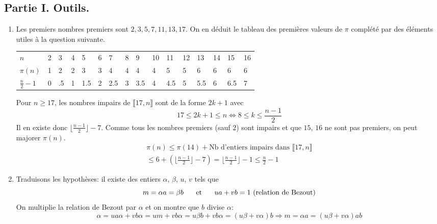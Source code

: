 \subsection*{Partie I. Outils.}
\begin{enumerate}
  \item Les premiers nombres premiers sont $2, 3, 5, 7, 11, 13, 17$. On en déduit le tableau des premières valeurs de $\pi$ complété par des éléments utiles à la question suivante.
  \begin{center}
\begin{tabular}{llllllllllllllll}
$n$             & 2 & 3 & 4 & 5 & 6 & 7 & 8 & 9 & 10 & 11 & 12 & 13 & 14 & 15 &16 \\
$\pi(n)$        & 1 & 2 & 2 & 3 & 3 & 4 & 4 & 4 & 4  & 5  & 5  & 6  & 6  & 6  & 6  \\
$\frac{n}{2}-1$ & 0 & .5& 1 &1.5& 2 &2.5& 3 &3.5& 4  & 4.5& 5  & 5.5& 6  & 6.5& 7  
  \end{tabular}
  \end{center}
Pour $n\geq 17$, les nombres impairs de $\llbracket 17, n\rrbracket$ sont de la forme $2k+1$ avec
\begin{displaymath}
  17 \leq 2k+1 \leq n \Leftrightarrow 8 \leq k \leq \frac{n-1}{2}
\end{displaymath}
Il en existe donc $\lfloor\frac{n-1}{2}\rfloor - 7$. Comme tous les nombres premiers (sauf $2$) sont impairs et que $15$, $16$ ne sont pas premiers, on peut majorer $\pi(n)$.
\begin{multline*}
  \pi(n) \leq \pi(14) + \text{Nb d'entiers impairs dans } \llbracket 17, n\rrbracket \\
   \leq 6 + \left( \lfloor\frac{n-1}{2}\rfloor - 7\right)  = \lfloor\frac{n-1}{2}\rfloor -1 \leq \frac{n}{2} -1
\end{multline*}

\item Traduisons les hypothèses: il existe des entiers $\alpha$, $\beta$, $u$, $v$ tels que 
\begin{displaymath}
  m = \alpha a = \beta b\hspace{0.5cm}\text{ et } \hspace{0.5cm} ua + vb = 1 \text{ (relation de Bezout)}
\end{displaymath}
On multiplie la relation de Bezout par $\alpha$ et on montre que $b$ divise $\alpha$:
\begin{displaymath}
  \alpha = ua\alpha + vb\alpha = um+vb\alpha = u\beta b +vb \alpha = (u\beta + v\alpha)b
\Rightarrow m = \alpha a = (u\beta + v\alpha)ab
\end{displaymath}


\end{enumerate}
